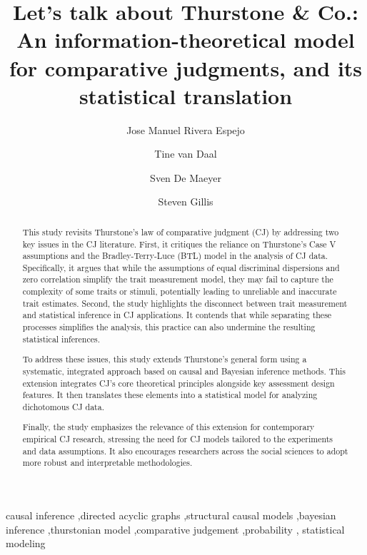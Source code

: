 \documentclass[
  authoryear,
  review,
  1p]{elsarticle}
\begin{document}
\begin{frontmatter}
\title{Let's talk about Thurstone \& Co.: An information-theoretical
model for comparative judgments, and its statistical translation}
\author[1]{Jose Manuel Rivera Espejo%
%
}
\author[1]{Tine van Daal%
%
}
\author[1]{Sven De Maeyer%
%
}
\author[2]{Steven Gillis%
%
}






        
\begin{abstract}
This study revisits Thurstone's law of comparative judgment (CJ) by
addressing two key issues in the CJ literature. First, it critiques the
reliance on Thurstone's Case V assumptions and the Bradley-Terry-Luce
(BTL) model in the analysis of CJ data. Specifically, it argues that
while the assumptions of equal discriminal dispersions and zero
correlation simplify the trait measurement model, they may fail to
capture the complexity of some traits or stimuli, potentially leading to
unreliable and inaccurate trait estimates. Second, the study highlights
the disconnect between trait measurement and statistical inference in CJ
applications. It contends that while separating these processes
simplifies the analysis, this practice can also undermine the resulting
statistical inferences.

To address these issues, this study extends Thurstone's general form
using a systematic, integrated approach based on causal and Bayesian
inference methods. This extension integrates CJ's core theoretical
principles alongside key assessment design features. It then translates
these elements into a statistical model for analyzing dichotomous CJ
data.

Finally, the study emphasizes the relevance of this extension for
contemporary empirical CJ research, stressing the need for CJ models
tailored to the experiments and data assumptions. It also encourages
researchers across the social sciences to adopt more robust and
interpretable methodologies.
\end{abstract}





\begin{keyword}
    causal inference \sep directed acyclic graphs \sep structural causal
models \sep bayesian inference \sep thurstonian model \sep comparative
judgement \sep probability \sep 
    statistical modeling
\end{keyword}
\end{frontmatter}
    
\end{document}
